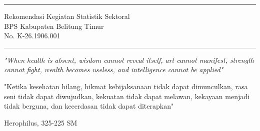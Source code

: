 \frontmatter
 
\cleardoublepage{}

{}

\noindent\rule{\linewidth}{\headrulewidth}

\vspace*{4ex}
{\raggedright Rekomendasi Kegiatan Statistik Sektoral\\BPS Kabupaten Belitung Timur\\No. K-26.1906.001
	
}
\vspace*{3ex}
\noindent\rule{\linewidth}{\headrulewidth}
\cleardoublepage

\pagestyle{plain}

 
\cleardoublepage{}
%

\cleardoublepage{}
%

\cleardoublepage{}
\newpage{}

\pagestyle{fancy}

\tableofcontents
\clearpage{}
\listoffigures
\clearpage{}
\listoftables
\cleardoublepage{}
\newpage{}\thispagestyle{empty}
\epigraph{\emph{"When health is absent, wisdom cannot reveal itself, art cannot manifest, strength cannot fight, wealth becomes useless, and intelligence cannot be applied"}

"Ketika kesehatan hilang, hikmat kebijaksanaan tidak dapat dimunculkan, rasa seni tidak dapat diwujudkan, kekuatan tidak dapat melawan, kekayaan menjadi tidak berguna, dan kecerdasan tidak dapat diterapkan"}{Herophilus, 325-225 SM}
\clearpage{} 